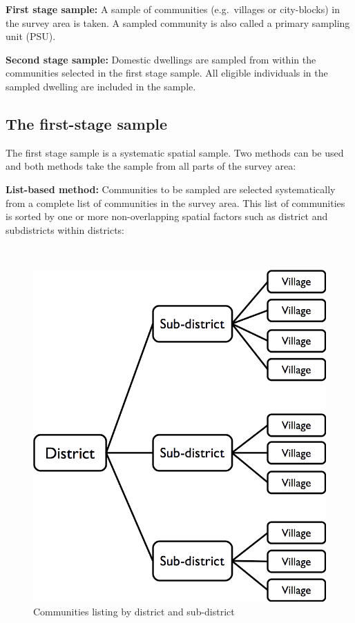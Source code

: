 \documentclass[12pt,]{book}
\theoremstyle{definition}
\theoremstyle{definition}
\theoremstyle{definition}
\theoremstyle{remark}
\begin{document}
\textbf{First stage sample:} A sample of communities (e.g.~villages or
city-blocks) in the survey area is taken. A sampled community is also
called a primary sampling unit (PSU).

\textbf{Second stage sample:} Domestic dwellings are sampled from within
the communities selected in the first stage sample. All eligible
individuals in the sampled dwelling are included in the sample.

\hypertarget{the-first-stage-sample}{%
\subsection{The first-stage sample}\label{the-first-stage-sample}}

The first stage sample is a systematic spatial sample. Two methods can
be used and both methods take the sample from all parts of the survey
area:

\textbf{List-based method:} Communities to be sampled are selected
systematically from a complete list of communities in the survey area.
This list of communities is sorted by one or more non-overlapping
spatial factors such as district and subdistricts within districts:

~

\begin{figure}

{\centering \includegraphics[width=9.72in]{figures/listSample} 

}

\caption{Communities listing by district and sub-district}\label{fig:sample1}
\end{figure}
\end{document}
